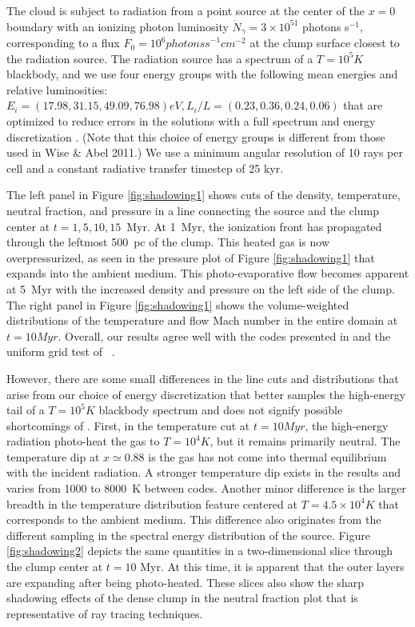 The cloud is subject to radiation from a point source at the center of
the $x=0$ boundary with an ionizing photon luminosity $\dot{N}_\gamma
= 3 \times 10^{51}$ photons s$^{-1}$, corresponding to a flux $F_0 =
10^6 \unit{photons s}^{-1} \unit{cm}^{-2}$ at the clump surface
closest to the radiation source.  The radiation source has a spectrum
of a $T = 10^5 \unit{K}$ blackbody, and we use four energy groups with
the following mean energies and relative luminosities: $E_i = (17.98,
31.15, 49.09, 76.98) \unit{eV}, L_i/L = (0.23, 0.36, 0.24, 0.06)$ that
are optimized to reduce errors in the solutions with a full spectrum
and energy discretization \citep{Mirocha12}.  (Note that this choice
of energy groups is different from those used in Wise \& Abel 2011.)
\nocite{Wise11_Moray} We use a minimum angular resolution of 10 rays
per cell and a constant radiative transfer timestep of 25 kyr.  

The left panel in Figure \ref{fig:shadowing1} shows cuts of the
density, temperature, neutral fraction, and pressure in a line
connecting the source and the clump center at $t = 1, 5, 10, 15$~Myr.
At 1~Myr, the ionization front has propagated through the leftmost
500~pc of the clump.  This heated gas is now overpressurized, as seen
in the pressure plot of Figure \ref{fig:shadowing1} that expands into
the ambient medium.  This photo-evaporative flow becomes apparent at
5~Myr with the increased density and pressure on the left side of the
clump.  The right panel in Figure \ref{fig:shadowing1} shows the
volume-weighted distributions of the temperature and flow Mach number
in the entire domain at $t = 10 \unit{Myr}$.  Overall, our results
agree well with the codes presented in \citet{IlievEtAl2009} and the
uniform grid test of \moray~\citep{Wise11_Moray}.

However, there are some small differences in the line cuts and
distributions that arise from our choice of energy discretization that
better samples the high-energy tail of a $T = 10^5 \unit{K}$ blackbody
spectrum and does not signify possible shortcomings of \moray.  First,
in the temperature cut at $t = 10 \unit{Myr}$, the high-energy
radiation photo-heat the gas to $T = 10^4 \unit{K}$, but it remains
primarily neutral.  The temperature dip at $x \simeq 0.88$ is the gas
has not come into thermal equilibrium with the incident radiation.  A
stronger temperature dip exists in the \citeauthor{IlievEtAl2009}
results and varies from 1000 to 8000~K between codes.  Another minor
difference is the larger breadth in the temperature distribution
feature centered at $T = 4.5 \times 10^4 \unit{K}$ that corresponds to
the ambient medium.  This difference also originates from the
different sampling in the spectral energy distribution of the source.
Figure \ref{fig:shadowing2} depicts the same quantities in a
two-dimensional slice through the clump center at $t = 10$ Myr.  At
this time, it is apparent that the outer layers are expanding after
being photo-heated.  These slices also show the sharp shadowing
effects of the dense clump in the neutral fraction plot that is
representative of ray tracing techniques.

